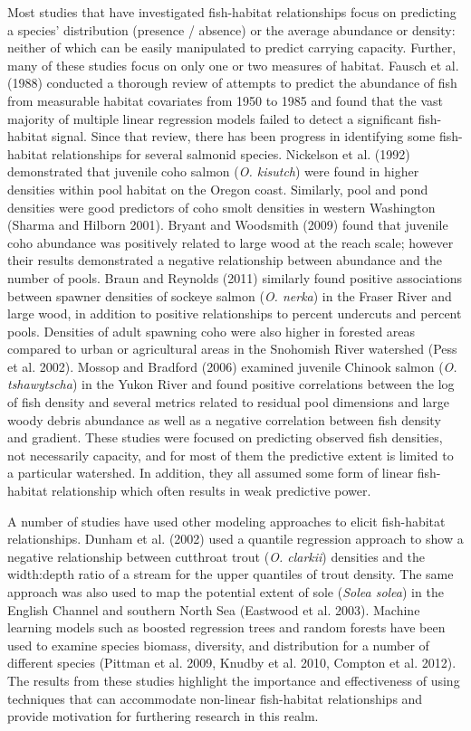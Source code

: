 \documentclass[
  12pt,
]{article}
\begin{document}
Most studies that have investigated fish-habitat relationships focus on predicting a species' distribution (presence / absence) or the average abundance or density: neither of which can be easily manipulated to predict carrying capacity. Further, many of these studies focus on only one or two measures of habitat. Fausch et al. (1988) conducted a thorough review of attempts to predict the abundance of fish from measurable habitat covariates from 1950 to 1985 and found that the vast majority of multiple linear regression models failed to detect a significant fish-habitat signal. Since that review, there has been progress in identifying some fish-habitat relationships for several salmonid species. Nickelson et al. (1992) demonstrated that juvenile coho salmon (\emph{O. kisutch}) were found in higher densities within pool habitat on the Oregon coast. Similarly, pool and pond densities were good predictors of coho smolt densities in western Washington (Sharma and Hilborn 2001). Bryant and Woodsmith (2009) found that juvenile coho abundance was positively related to large wood at the reach scale; however their results demonstrated a negative relationship between abundance and the number of pools. Braun and Reynolds (2011) similarly found positive associations between spawner densities of sockeye salmon (\emph{O. nerka}) in the Fraser River and large wood, in addition to positive relationships to percent undercuts and percent pools. Densities of adult spawning coho were also higher in forested areas compared to urban or agricultural areas in the Snohomish River watershed (Pess et al. 2002). Mossop and Bradford (2006) examined juvenile Chinook salmon (\emph{O. tshawytscha}) in the Yukon River and found positive correlations between the log of fish density and several metrics related to residual pool dimensions and large woody debris abundance as well as a negative correlation between fish density and gradient. These studies were focused on predicting observed fish densities, not necessarily capacity, and for most of them the predictive extent is limited to a particular watershed. In addition, they all assumed some form of linear fish-habitat relationship which often results in weak predictive power.

A number of studies have used other modeling approaches to elicit fish-habitat relationships. Dunham et al. (2002) used a quantile regression approach to show a negative relationship between cutthroat trout (\emph{O. clarkii}) densities and the width:depth ratio of a stream for the upper quantiles of trout density. The same approach was also used to map the potential extent of sole (\emph{Solea solea}) in the English Channel and southern North Sea (Eastwood et al. 2003). Machine learning models such as boosted regression trees and random forests have been used to examine species biomass, diversity, and distribution for a number of different species (Pittman et al. 2009, Knudby et al. 2010, Compton et al. 2012). The results from these studies highlight the importance and effectiveness of using techniques that can accommodate non-linear fish-habitat relationships and provide motivation for furthering research in this realm.
\end{document}
